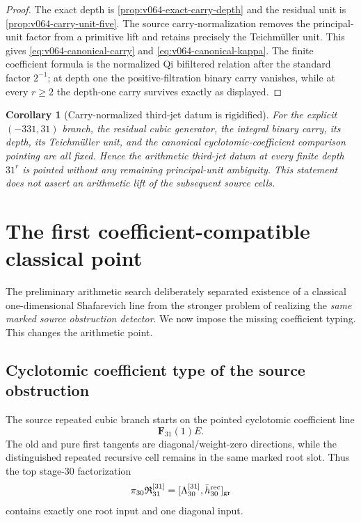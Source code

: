 \documentclass[11pt]{article}
\newtheorem{corollary}[theorem]{Corollary}
\theoremstyle{remark}
\begin{document}
\begin{proof}
The exact depth is \cref{prop:v064-exact-carry-depth} and the residual unit is
\cref{prop:v064-carry-unit-five}.  The source carry-normalization removes the
principal-unit factor from a primitive lift and retains precisely the
Teichm\"uller unit.  This gives \eqref{eq:v064-canonical-carry} and
\eqref{eq:v064-canonical-kappa}.  The finite coefficient formula is the
normalized Qi bifiltered relation after the standard factor \(2^{-1}\); at
depth one the positive-filtration binary carry vanishes, while at every
\(r\ge2\) the depth-one carry survives exactly as displayed.
\end{proof}

\begin{corollary}[Carry-normalized third-jet datum is rigidified]
\label{cor:v064-thirdjet-roof-rigidified}
For the explicit \((-331,31)\) branch, the residual cubic generator, the
integral binary carry, its depth, its Teichm\"uller unit, and the canonical
cyclotomic-coefficient comparison pointing are all fixed.  Hence the arithmetic
\emph{third-jet} datum at every finite depth \(31^r\) is pointed without any
remaining principal-unit ambiguity.  This statement does not assert an
arithmetic lift of the subsequent source cells.
\end{corollary}

\section{The first coefficient-compatible classical point}
\label{sec:v073-root-typed}

The preliminary arithmetic search deliberately separated existence of a classical
one-dimensional Shafarevich line from the stronger problem of realizing the
\emph{same marked source obstruction detector}.  We now impose the missing
coefficient typing.  This changes the arithmetic point.

\subsection{Cyclotomic coefficient type of the source obstruction}

The source repeated cubic branch starts on the pointed cyclotomic
coefficient line
\[
 \mathbf F_{31}(1)E.
\]
The old and pure first tangents are diagonal/weight-zero directions, while
the distinguished repeated recursive cell remains in the same marked root
slot.  Thus the top stage-\(30\) factorization
\[
 \pi_{30}\mathfrak R_{31}^{[31]}
 =
 [\Lambda_{30}^{[31]},\bar h_{30}^{\rm rec}]_{\rm gr}
\]
contains exactly one root input and one diagonal input.
\end{document}

